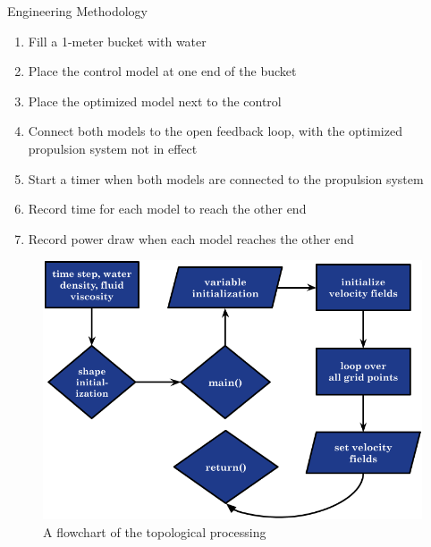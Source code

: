\documentclass[final, 16pt]{beamer}
\newlength{\colwidth}
\newlength{\twocolwidth}
\begin{document}
\begin{frame}[t]
\begin{columns}[t]
\begin{column}{\twocolwidth}
\begin{block}{Engineering Methodology}

    \begin{minipage}[t]{0.48\linewidth}
      \begin{enumerate}
        \item Fill a 1-meter bucket with water
        \item Place the control model at one end of the bucket
        \item Place the optimized model next to the control
        \item Connect both models to the open feedback loop, with the optimized propulsion system not in effect
        \item Start a timer when both models are connected to the propulsion system
        \item Record time for each model to reach the other end
        \item Record power draw when each model reaches the other end
      \end{enumerate}

      \vspace{1cm}

      \begin{figure}[H]
        \centering
        \includegraphics[width=0.7\linewidth, height=0.50\linewidth]{img/Topological_Flow_Chart.png}
        \caption{A flowchart of the topological processing}
        \label{fig:topological-flow-chart}
      \end{figure}

    \end{minipage}\hfill%
    \begin{minipage}[t]{0.48\linewidth}


\end{minipage}
\end{block}
\end{column}
\end{columns}
\end{frame}
\end{document}
